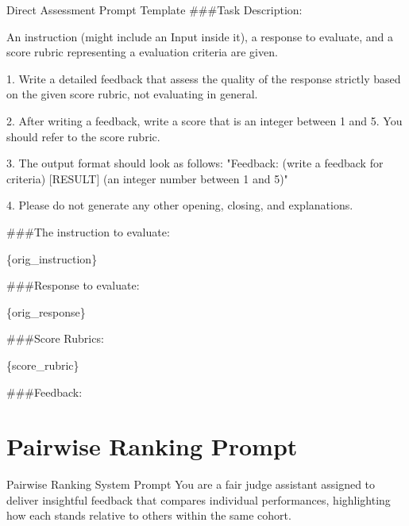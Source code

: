 \documentclass[11pt]{article}
\begin{document}
\begin{mybox}{Direct Assessment Prompt Template}
\#\#\#Task Description:

An instruction (might include an Input inside it), a response to evaluate, and a score rubric representing a evaluation criteria are given.

1. Write a detailed feedback that assess the quality of the response strictly based on the given score rubric, not evaluating in general.

2. After writing a feedback, write a score that is an integer between 1 and 5. You should refer to the score rubric.

3. The output format should look as follows: "Feedback: (write a feedback for criteria) [RESULT] (an integer number between 1 and 5)"

4. Please do not generate any other opening, closing, and explanations.

\#\#\#The instruction to evaluate:

\{orig\_instruction\}

\#\#\#Response to evaluate:

\{orig\_response\}

\#\#\#Score Rubrics:

\{score\_rubric\}

\#\#\#Feedback: 
\end{mybox}


\section{Pairwise Ranking Prompt}\label{appendix:pairwise_ranking_prompt}

\begin{mybox}{Pairwise Ranking System Prompt}
You are a fair judge assistant assigned to deliver insightful feedback that compares individual performances, highlighting how each stands relative to others within the same cohort.
\end{mybox}
\end{document}

